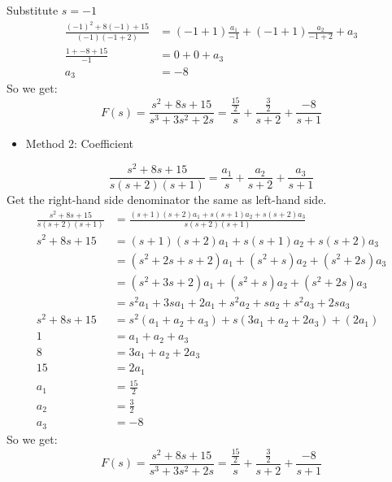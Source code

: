 \documentclass[12pt,a4paper]{article}
\begin{document}
	Substitute \(s=-1\)
	\[
	\begin{split}
		\frac{(-1)^2+8(-1)+15}{(-1)(-1+2)} &= (-1+1)\frac{a_1}{-1} + (-1+1)\frac{a_2}{-1+2} + a_3 \\
		\frac{1+-8+15}{-1} &= 0 + 0 + a_3 \\
		a_3 &= -8
	\end{split}
	\]
	So we get:
	\[
	\boxed{F(s) = \frac{s^2+8s+15}{s^3+3s^2+2s} = \frac{\frac{15}{2}}{s} + \frac{\frac{3}{2}}{s+2} + \frac{-8}{s+1}}
	\]
	\begin{itemize}
		\item Method 2: Coefficient
	\end{itemize}
	\[
	\frac{s^2+8s+15}{s(s+2)(s+1)} = \frac{a_1}{s} + \frac{a_2}{s+2} + \frac{a_3}{s+1} 
	\]
	Get the right-hand side denominator the same as left-hand side.
	\[
	\begin{split}
				\frac{s^2+8s+15}{s(s+2)(s+1)} &= \frac{(s+1)(s+2)a_1+s(s+1)a_2+s(s+2)a_3}{s(s+2)(s+1)} \\
				s^2+8s+15 &= (s+1)(s+2)a_1+s(s+1)a_2+s(s+2)a_3 \\
				&= (s^2+2s+s+2)a_1 + (s^2+s)a_2 + (s^2+2s)a_3 \\
				&= (s^2+3s+2)a_1 + (s^2+s)a_2 + (s^2+2s)a_3 \\
				&= s^2a_1+3sa_1+2a_1 + s^2a_2+sa_2 + s^2a_3+2sa_3 \\
				s^2+8s+15 &= s^2(a_1+a_2+a_3) + s(3a_1+a_2+2a_3) + (2a_1)\\
				1 &= a_1+a_2+a_3 \\
				8 &= 3a_1+a_2+2a_3 \\
				15 &= 2a_1 \\
				a_1 &= \frac{15}{2} \\
				a_2 &= \frac{3}{2} \\
				a_3 &= -8
	\end{split}
	\]
	So we get:
	\[
	\boxed{F(s) = \frac{s^2+8s+15}{s^3+3s^2+2s} = \frac{\frac{15}{2}}{s} + \frac{\frac{3}{2}}{s+2} + \frac{-8}{s+1}}
	\]
	
\end{document}
